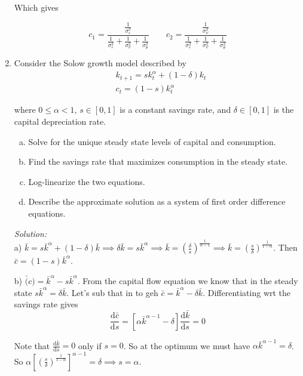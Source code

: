 \documentclass[12pt]{article}
\newif\ifsln
\renewcommand{\epsilon}{\varepsilon}
\begin{document}
\begin{enumerate}[1.]
Which gives

\[c_{1} = \frac{ \frac{1}{\sigma^{2}_{\epsilon}} } {\frac{1}{\sigma^{2}_{\epsilon}} + \frac{1}{\sigma^{2}_{\nu}} + \frac{1}{\sigma^{2}_{\theta} } }
\qquad 
c_{2} = \frac{ \frac{1}{\sigma^{2}_{\nu}} } {\frac{1}{\sigma^{2}_{\epsilon}} + \frac{1}{\sigma^{2}_{\nu}} + \frac{1}{\sigma^{2}_{\theta} } }
\]

\fi

\item Consider the Solow growth model described by
\begin{align}
& k_{t+1} = s k_{t}^{\alpha} + (1-\delta)k_{t}\\
& c_{t} = (1-s) k_{t}^{\alpha}
\end{align}

where $0 \leq \alpha < 1$, $s \in [0, 1]$ is a constant savings rate, and $\delta \in [0, 1]$ is the capital depreciation rate.

\begin{enumerate}[a)]
	\item Solve for the unique steady state levels of capital and consumption.
	\item Find the savings rate that maximizes consumption in the steady state.
	\item Log-linearize the two equations.
	\item Describe the approximate solution as a system of first order difference equations.
\end{enumerate}

\ifsln
\textit{Solution:}\\
a) $\bar{k} = s \bar{k}^{\alpha} + (1-\delta)\bar{k} \implies \delta \bar{k} = s\bar{k}^{\alpha} \implies \bar{k} = (\frac{\delta}{s})^{\frac{1}{\alpha-1}} \implies \bar{k} = (\frac{s}{\delta})^{\frac{1}{1-\alpha}}$. Then $\bar{c} = (1-s)\bar{k}^{\alpha}$.\medskip

b) $\bar(c) = \bar{k}^{\alpha} - s\bar{k}^{\alpha}$. From the capital flow equation we know that in the steady state $s\bar{k}^{\alpha} = \delta \bar{k}$. Let's sub that in to geh $\bar{c} = \bar{k}^{\alpha} - \delta \bar{k}$. Differentiating wrt the savings rate gives
\[\frac{\mathrm{d}\bar{c}}{\mathrm{d} s} = \left[\alpha\bar{k}^{\alpha-1} - \delta\right]\frac{\mathrm{d}\bar{k}}{\mathrm{d} s} = 0\]

Note that  $\frac{\mathrm{d}\bar{k}}{\mathrm{d} s} = 0$ only if $s=0$. So at the optimum we must have $\alpha\bar{k}^{\alpha-1} = \delta$. So $\alpha \left[ \left(\frac{s}{\delta}\right)^{\frac{1}{1-\alpha}}\right]^{\alpha-1} = \delta \implies s = \alpha$.\medskip


\end{enumerate}
\end{document}
